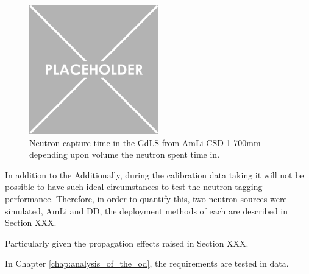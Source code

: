 




\begin{figure}
    \centering
    \includegraphics[width=0.5\textwidth]{Figures/Placeholder.png}
    \caption{Neutron capture time in the GdLS from AmLi CSD-1 700mm depending upon volume the neutron spent time in.}
    \label{fig:simulated_neutron_capture_time_vs_volume}
\end{figure}



\par
In addition to the
Additionally, during the calibration data taking it will not be possible to have such ideal circumstances to test the neutron tagging performance.
Therefore, in order to quantify this, two neutron sources were simulated, AmLi and DD, the deployment methods of each are described in Section XXX.


Particularly given the propagation effects raised in Section XXX.
\par
In Chapter \ref{chap:analysis_of_the_od}, the requirements are tested in data.

